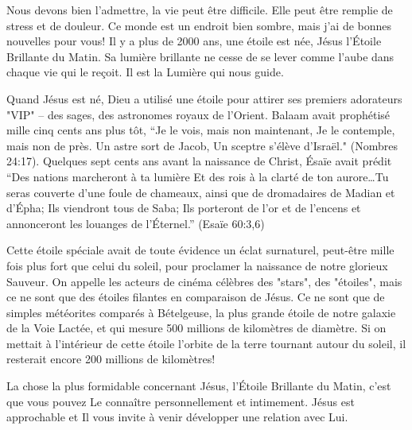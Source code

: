 


Nous devons bien l'admettre, la vie peut être difficile. Elle peut être remplie de stress et de douleur. Ce monde est un endroit bien sombre, mais j'ai de bonnes nouvelles pour vous! Il y a plus de 2000 ans, une étoile est née, Jésus l'Étoile Brillante du Matin. Sa lumière brillante ne cesse de se lever comme l'aube dans chaque vie qui le reçoit. Il est la Lumière qui nous guide.

Quand Jésus est né, Dieu a utilisé une étoile pour attirer ses premiers adorateurs "VIP" – des sages, des astronomes royaux de l'Orient. Balaam avait prophétisé mille cinq cents ans plus tôt, “Je le vois, mais non maintenant, Je le contemple, mais non de près. Un astre sort de Jacob, Un sceptre s’élève d’Israël." (Nombres 24:17). Quelques sept cents ans avant la naissance de Christ, Ésaïe avait prédit “Des nations marcheront à ta lumière Et des rois à la clarté de ton aurore…Tu seras couverte d’une foule de chameaux, ainsi que de dromadaires de Madian et d’Épha; Ils viendront tous de Saba; Ils porteront de l’or et de l’encens et annonceront les louanges de l’Éternel.” (Esaïe 60:3,6)

Cette étoile spéciale avait de toute évidence un éclat surnaturel, peut-être mille fois plus fort que celui du soleil, pour proclamer la naissance de notre glorieux Sauveur. On appelle les acteurs de cinéma célèbres des "stars", des "étoiles", mais ce ne sont que des étoiles filantes en comparaison de Jésus. Ce ne sont que de simples météorites comparés à Bételgeuse, la plus grande étoile de notre galaxie de la Voie Lactée, et qui mesure 500 millions de kilomètres de diamètre. Si on mettait à l'intérieur de cette étoile l'orbite de la terre tournant autour du soleil, il resterait encore 200 millions de kilomètres!

La chose la plus formidable concernant Jésus, l'Étoile Brillante du Matin, c'est que vous pouvez Le connaître personnellement et intimement. Jésus est approchable et Il vous invite à venir développer une relation avec Lui.


             
       

